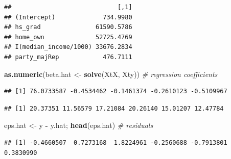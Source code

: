 \documentclass[]{article}
\newenvironment{Shaded}{\begin{snugshade}}{\end{snugshade}}
\newcommand{\CommentTok}[1]{\textcolor[rgb]{0.56,0.35,0.01}{\textit{#1}}}
\newcommand{\KeywordTok}[1]{\textcolor[rgb]{0.13,0.29,0.53}{\textbf{#1}}}
\newcommand{\NormalTok}[1]{#1}
\newcommand{\OperatorTok}[1]{\textcolor[rgb]{0.81,0.36,0.00}{\textbf{#1}}}
\newcommand{\StringTok}[1]{\textcolor[rgb]{0.31,0.60,0.02}{#1}}
\begin{document}
\begin{Shaded}
\end{Shaded}

\begin{verbatim}
##                             [,1]
## (Intercept)             734.9980
## hs_grad               61590.5786
## home_own              52725.4769
## I(median_income/1000) 33676.2834
## party_majRep            476.7111
\end{verbatim}

\begin{Shaded}
\begin{Highlighting}[]
\KeywordTok{as.numeric}\NormalTok{(beta.hat <-}\StringTok{ }\KeywordTok{solve}\NormalTok{(XtX, Xty))  }\CommentTok{# regression coefficients}
\end{Highlighting}
\end{Shaded}

\begin{verbatim}
## [1] 76.0733587 -0.4534462 -0.1461374 -0.2610123 -0.5109967
\end{verbatim}

\begin{Shaded}
\end{Shaded}

\begin{verbatim}
## [1] 20.37351 11.56579 17.21084 20.26140 15.01207 12.47784
\end{verbatim}

\begin{Shaded}
\begin{Highlighting}[]
\NormalTok{eps.hat <-}\StringTok{ }\NormalTok{y }\OperatorTok{-}\StringTok{ }\NormalTok{y.hat; }\KeywordTok{head}\NormalTok{(eps.hat)  }\CommentTok{# residuals}
\end{Highlighting}
\end{Shaded}

\begin{verbatim}
## [1] -0.4660507  0.7273168  1.8224961 -0.2560688 -0.7913801  0.3830990
\end{verbatim}
\end{document}
